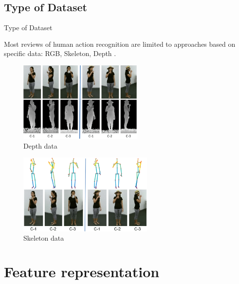 \subsection{Type of Dataset}
\begin{frame}{Type of Dataset}

    Most reviews of human action recognition are limited to approaches based on specific data: RGB, Skeleton, Depth \cite{shahroudy2016ntu}.

    \begin{multicols}{2}
        \begin{figure}[htp]
            \centering
            \includegraphics[height=4cm]{images/v1survey/depth_data_ex.png}
            \caption{Depth data}
            \label{fig:depth_data_ex}
        \end{figure}
        \begin{figure}[htp]
            \centering
            \includegraphics[height=4cm]{images/v1survey/skeleton_data_ex.png}
            \caption{Skeleton data}
            \label{fig:skeleton_data_ex}
        \end{figure}
    \end{multicols}
\end{frame}

\section{Feature representation}
